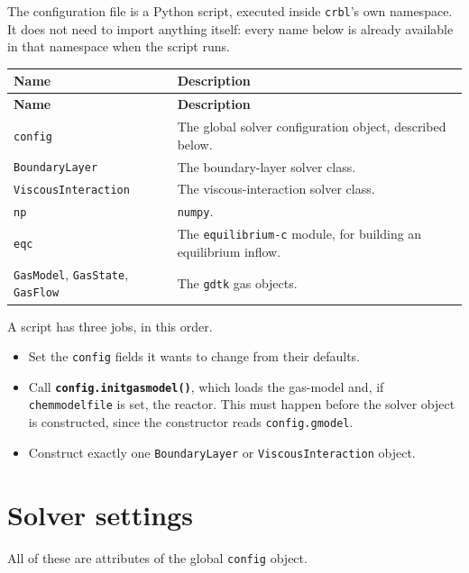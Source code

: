 \documentclass[10pt,a4paper]{article}
\renewcommand{\_}{\origunderscore\penalty4000\relax}
\begin{document}
The configuration file is a Python script, executed inside \texttt{crbl}'s own namespace. It does not need to import anything itself: every name below is already available in that namespace when the script runs.

\begin{longtable}{@{}L{40mm}L{114mm}@{}}
    \toprule
    \textbf{Name} & \textbf{Description} \\
    \midrule
    \endfirsthead
    \toprule
    \textbf{Name} & \textbf{Description} \\
    \midrule
    \endhead
    \bottomrule
    \endfoot
    \endlastfoot
    \texttt{config} & The global solver configuration object, described below. \\
    \addlinespace
    \texttt{BoundaryLayer} & The boundary-layer solver class. \\
    \addlinespace
    \texttt{ViscousInteraction} & The viscous-interaction solver class. \\
    \addlinespace
    \texttt{np} & \texttt{numpy}. \\
    \addlinespace
    \texttt{eqc} & The \texttt{equilibrium-c} module, for building an equilibrium inflow. \\
    \addlinespace
    \texttt{GasModel}, \texttt{GasState}, \texttt{GasFlow} & The \texttt{gdtk} gas objects. \\
    \bottomrule
\end{longtable}

A script has three jobs, in this order.

\begin{itemize}
    \item Set the \texttt{config} fields it wants to change from their defaults.
    \item Call \textbf{\texttt{config.init\_gas\_model()}}, which loads the gas-model and, if \texttt{chem\_model\_file} is set, the reactor. This must happen before the solver object is constructed, since the constructor reads \texttt{config.gmodel}.
    \item Construct exactly one \texttt{BoundaryLayer} or \texttt{ViscousInteraction} object.
\end{itemize}

\section*{Solver settings}

All of these are attributes of the global \texttt{config} object.
\end{document}

